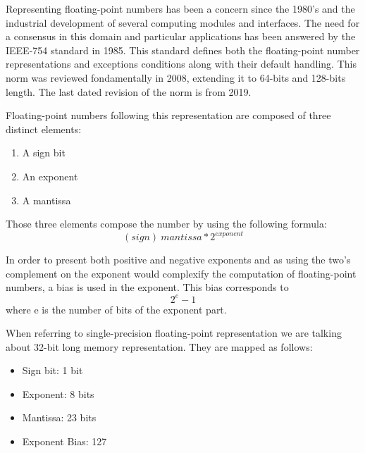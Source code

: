 Representing floating-point numbers has been a concern since the 1980's and the industrial development of several computing modules and interfaces. The need for a consensus in this domain and particular applications has been answered by the IEEE-754 standard in 1985. This standard defines both the floating-point number representations and exceptions conditions along with their default handling. This norm was reviewed fondamentally in 2008, extending it to 64-bits and 128-bits length. The last dated revision of the norm is from 2019.

Floating-point numbers following this representation are composed of three distinct elements:
\begin{enumerate}
  \item A sign bit
  \item An exponent
  \item A mantissa
\end{enumerate}

Those three elements compose the number by using the following formula:
\begin{equation}
  (sign)\ mantissa * 2^{exponent}
\end{equation}

In order to present both positive and negative exponents and as using the two's complement on the exponent would complexify the computation of floating-point numbers, a bias is used in the exponent. This bias corresponds to
\begin{equation}
  2^e - 1
\end{equation}
where e is the number of bits of the exponent part.

When referring to single-precision floating-point representation we are talking about 32-bit long memory representation. They are mapped as follows:
\begin{itemize}
  \item Sign bit: 1 bit
  \item Exponent: 8 bits
  \item Mantissa: 23 bits
  \item Exponent Bias: 127
\end{itemize}


